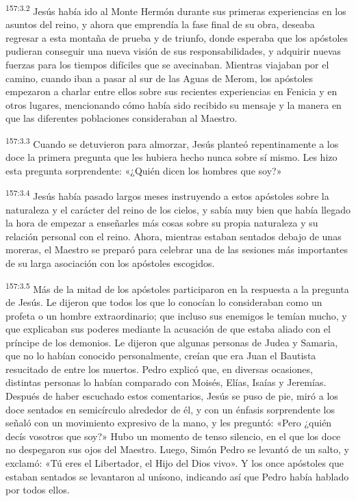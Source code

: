 \par 
\textsuperscript{157:3.2} Jesús había ido al Monte Hermón durante sus primeras experiencias en los asuntos del reino, y ahora que emprendía la fase final de su obra, deseaba regresar a esta montaña de prueba y de triunfo, donde esperaba que los apóstoles pudieran conseguir una nueva visión de sus responsabilidades, y adquirir nuevas fuerzas para los tiempos difíciles que se avecinaban. Mientras viajaban por el camino, cuando iban a pasar al sur de las Aguas de Merom, los apóstoles empezaron a charlar entre ellos sobre sus recientes experiencias en Fenicia y en otros lugares, mencionando cómo había sido recibido su mensaje y la manera en que las diferentes poblaciones consideraban al Maestro.

\par 
\textsuperscript{157:3.3} Cuando se detuvieron para almorzar, Jesús planteó repentinamente a los doce la primera pregunta que les hubiera hecho nunca sobre sí mismo. Les hizo esta pregunta sorprendente: «¿Quién dicen los hombres que soy?»

\par 
\textsuperscript{157:3.4} Jesús había pasado largos meses instruyendo a estos apóstoles sobre la naturaleza y el carácter del reino de los cielos, y sabía muy bien que había llegado la hora de empezar a enseñarles más cosas sobre su propia naturaleza y su relación personal con el reino. Ahora, mientras estaban sentados debajo de unas moreras, el Maestro se preparó para celebrar una de las sesiones más importantes de su larga asociación con los apóstoles escogidos.

\par 
\textsuperscript{157:3.5} Más de la mitad de los apóstoles participaron en la respuesta a la pregunta de Jesús. Le dijeron que todos los que lo conocían lo consideraban como un profeta o un hombre extraordinario; que incluso sus enemigos le temían mucho, y que explicaban sus poderes mediante la acusación de que estaba aliado con el príncipe de los demonios. Le dijeron que algunas personas de Judea y Samaria, que no lo habían conocido personalmente, creían que era Juan el Bautista resucitado de entre los muertos. Pedro explicó que, en diversas ocasiones, distintas personas lo habían comparado con Moisés, Elías, Isaías y Jeremías. Después de haber escuchado estos comentarios, Jesús se puso de pie, miró a los doce sentados en semicírculo alrededor de él, y con un énfasis sorprendente los señaló con un movimiento expresivo de la mano, y les preguntó: «Pero ¿quién decís vosotros que soy?» Hubo un momento de tenso silencio, en el que los doce no despegaron sus ojos del Maestro. Luego, Simón Pedro se levantó de un salto, y exclamó: «Tú eres el Libertador, el Hijo del Dios vivo». Y los once apóstoles que estaban sentados se levantaron al unísono, indicando así que Pedro había hablado por todos ellos.

